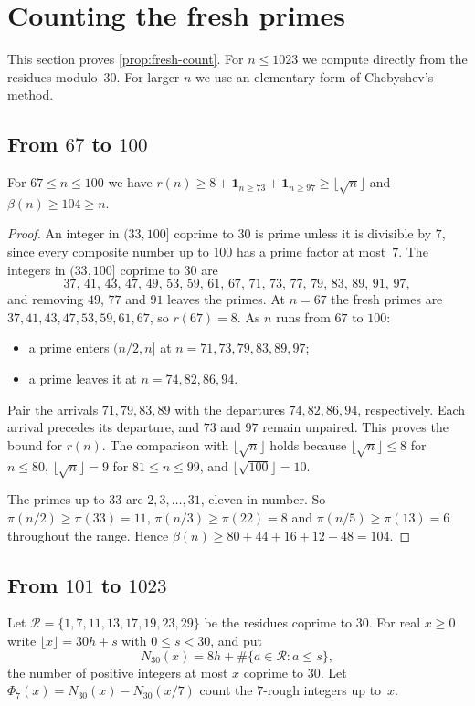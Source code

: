 \section{Counting the fresh primes}\label{sec:primes}

This section proves \cref{prop:fresh-count}. For $n\le1023$ we compute directly from the residues modulo~$30$. For larger $n$ we use an elementary form of Chebyshev's method.

\subsection{From \texorpdfstring{$67$}{67} to \texorpdfstring{$100$}{100}}

\begin{lemma}\label{lem:67-100}
For $67\le n\le100$ we have $r(n)\ge8+\mathbf 1_{n\ge73}+\mathbf 1_{n\ge97}\ge\lfloor\sqrt n\rfloor$ and $\beta(n)\ge104\ge n$.
\end{lemma}

\begin{proof}
An integer in $(33,100]$ coprime to $30$ is prime unless it is divisible by $7$, since every composite number up to $100$ has a prime factor at most~$7$. The integers in $(33,100]$ coprime to $30$ are
\[
 37,\,41,\,43,\,47,\,49,\,53,\,59,\,61,\,67,\,71,\,73,\,77,\,79,\,83,\,89,\,91,\,97,
\]
and removing $49$, $77$ and $91$ leaves the primes. At $n=67$ the fresh primes are $37,41,43,47,53,59,61,67$, so $r(67)=8$. As $n$ runs from $67$ to $100$:
\begin{itemize}
\item a prime enters $(n/2,n]$ at $n=71,73,79,83,89,97$;
\item a prime leaves it at $n=74,82,86,94$.
\end{itemize}
Pair the arrivals $71,79,83,89$ with the departures $74,82,86,94$, respectively. Each arrival precedes its departure, and $73$ and $97$ remain unpaired. This proves the bound for $r(n)$. The comparison with $\lfloor\sqrt n\rfloor$ holds because $\lfloor\sqrt n\rfloor\le8$ for $n\le80$, $\lfloor\sqrt n\rfloor=9$ for $81\le n\le99$, and $\lfloor\sqrt{100}\rfloor=10$.

The primes up to $33$ are $2,3,\dots,31$, eleven in number. So $\pi(n/2)\ge\pi(33)=11$, $\pi(n/3)\ge\pi(22)=8$ and $\pi(n/5)\ge\pi(13)=6$ throughout the range. Hence $\beta(n)\ge80+44+16+12-48=104$.
\end{proof}

\subsection{From \texorpdfstring{$101$}{101} to \texorpdfstring{$1023$}{1023}}
Let $\mathcal R=\{1,7,11,13,17,19,23,29\}$ be the residues coprime to $30$. For real $x\ge0$ write $\lfloor x\rfloor=30h+s$ with $0\le s<30$, and put
\[
 N_{30}(x)=8h+\#\{a\in\mathcal R:a\le s\},
\]
the number of positive integers at most $x$ coprime to $30$. Let $\Phi_7(x)=N_{30}(x)-N_{30}(x/7)$ count the $7$-rough integers up to~$x$.

